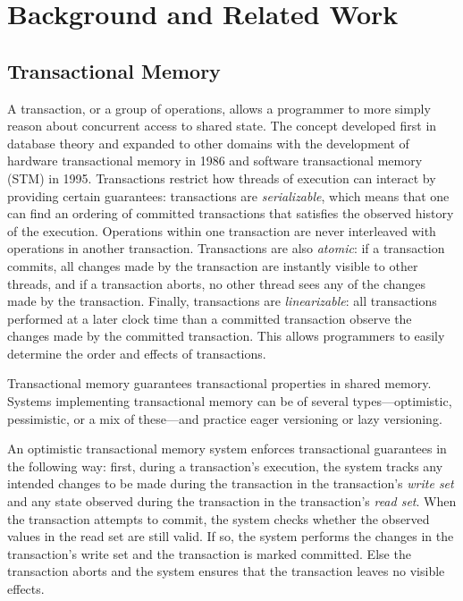 \chapter{Background and Related Work}
\label{related_work}

\section{Transactional Memory}
A transaction, or a group of operations, allows a programmer to more simply reason about concurrent access to shared state. The concept developed first in database theory and expanded to other domains with the development of hardware transactional memory in 1986 and software transactional memory (STM) in 1995. Transactions restrict how threads of execution can interact by providing certain guarantees: transactions are \emph{serializable}, which means that one can find an ordering of committed transactions that satisfies the observed history of the execution. Operations within one transaction are never interleaved with operations in another transaction. Transactions are also \emph{atomic}: if a transaction commits, all changes made by the transaction are instantly visible to other threads, and if a transaction aborts, no other thread sees any of the changes made by the transaction. Finally, transactions are \emph{linearizable}\cite{linearizability}: all transactions performed at a later clock time than a committed transaction observe the changes made by the committed transaction. This allows programmers to easily determine the order and effects of transactions.

Transactional memory\cite{harristm}\cite{herlihytm} guarantees transactional properties in shared memory. Systems implementing transactional memory can be of several types---optimistic, pessimistic, or a mix of these---and practice eager versioning or lazy versioning. 

An optimistic transactional memory system\cite{harristm} enforces transactional guarantees in the following way: first, during a transaction's execution, the system tracks any intended changes to be made during the transaction in the transaction's \emph{write set} and any state observed during the transaction in the transaction's \emph{read set}. When the transaction attempts to commit, the system checks whether the observed values in the read set are still valid. If so, the system performs the changes in the transaction's write set and the transaction is marked committed. Else the transaction aborts and the system ensures that the transaction leaves no visible effects.

